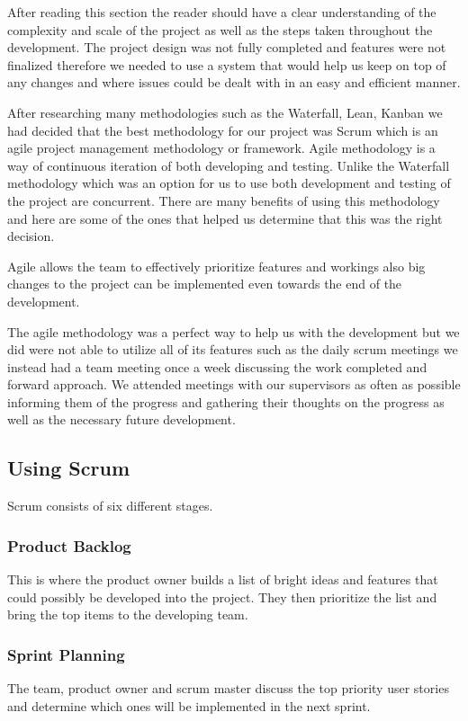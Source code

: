 \documentclass[a4paper,12pt]{report}
\begin{document}
After reading this section the reader should have a clear understanding of the complexity and scale of the project as well as the steps taken throughout the development. The project design was not fully completed and features were not finalized therefore we needed to use a system that would help us keep on top of any changes and where issues could be dealt with in an easy and efficient manner.

After researching many methodologies such as the Waterfall, Lean, Kanban we had decided that the best methodology for our project was Scrum which is an agile project management methodology or framework.
Agile methodology is a way of continuous iteration of both developing and testing. Unlike the Waterfall methodology which was an option for us to use both development and testing of the project are concurrent. 
There are many benefits of using this methodology and here are some of the ones that helped us determine that this was the right decision.

Agile allows the team to effectively prioritize features and workings also big changes to the project can be implemented even towards the end of the development.\cite{agileResearch}

The agile methodology was a perfect way to help us with the development but we did were not able to utilize all of its features such as the daily scrum meetings we instead had a team meeting once a week discussing the work completed and forward approach. We attended meetings with our supervisors as often as possible informing them of the progress and gathering their thoughts on the progress as well as the necessary future development.   

\subsection{Using Scrum}
Scrum consists of six different stages.
\subsubsection{Product Backlog}
This is where the product owner builds a list of bright ideas and features that could possibly be developed into the project.
They then prioritize the list and bring the top items to the developing team.
\subsubsection{Sprint Planning}
The team, product owner and scrum master discuss the top priority user stories and determine which ones will be implemented in the next sprint.
\end{document}
